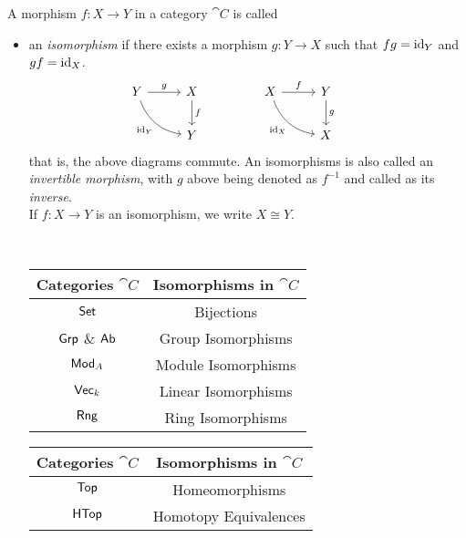 \begin{definition}
A morphism $f:X \to Y$ in a category $\cat{C}$ is called 
\begin{itemize}[itemsep=1em]
\item an \emph{isomorphism} if there exists a morphism $g: Y \to X$ such that $fg = \operatorname{id}_{Y}$ and $gf = \operatorname{id}_X$.
\[\begin{tikzcd}
Y \arrow[rd, "\id_Y"', bend right] \arrow[r, "g"] &[0.2em] X \arrow[d, "f"] &   \\[0.2em]
                                                   &                   Y
\end{tikzcd}\qquad
\begin{tikzcd}
X \arrow[rd, "\id_X"', bend right] \arrow[r, "f"] &[0.2em] Y \arrow[d, "g"] &   \\[0.2em]
                                                   &                   X
\end{tikzcd}\]
that is, the above diagrams commute. An isomorphisms is also called an \emph{invertible morphism}, with $g$ above being denoted as $f^{-1}$ and called as its \emph{inverse}.\\[0.5em]
If $f:X \to Y$ is an isomorphism, we write $X \cong Y$.\\
\begin{example}\hfill\\[-1em]
\begin{center}
    {\renewcommand{\arraystretch}{2}%
    \begin{tabular}{|c|c|}
    \hline
    {\bf Categories $\cat{C}$} & {\bf Isomorphisms in $\cat{C}$}\\
    \hline
    $\mathsf{Set}$ & Bijections\\
    \hline
    $\mathsf{Grp}$ \& $\mathsf{Ab}$ & Group Isomorphisms\\
    \hline
    $\mathsf{Mod}_A$ & Module Isomorphisms\\
    \hline
    $\mathsf{Vec}_k$ & Linear Isomorphisms\\
    \hline
    $\mathsf{Rng}$ & Ring Isomorphisms\\
    \hline
    \end{tabular}}
    \qquad
    {\renewcommand{\arraystretch}{2}%
    \begin{tabular}{|c|c|}
    \hline
    {\bf Categories $\cat{C}$} & {\bf Isomorphisms in $\cat{C}$}\\
    \hline
    $\mathsf{Top}$ & Homeomorphisms\\
    \hline
    $\mathsf{HTop}$ & Homotopy Equivalences\\

\end{tabular}}
\end{center}
\end{example}
\end{itemize}
\end{definition}
